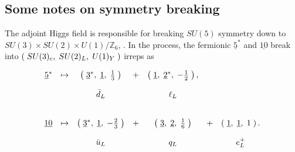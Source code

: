 \documentclass[letterpaper,12pt,titlepage,oneside,final]{book}
\begin{document}

\subsection{Some notes on symmetry breaking  }

The adjoint Higgs field  is responsible for breaking $SU(5)$ symmetry down to $SU(3)\times SU(2) \times U(1)/\mathbb{Z}_6$, \cite{Robinson}.  In the process, the fermionic $\underline{5}^*$ and $\underline{10}$ break into $\left(\hspace{1mm}SU(3)_c, \hspace{1mm}SU(2)_L, \hspace{1mm}U(1)_Y\hspace{1mm}\right)$ irreps as

\begin{equation}\begin{array}{rcccccc}
\underline{5}^* & \mapsto & \left(\hspace{1mm} \underline{3}^*, \hspace{1mm}\underline{1}, \hspace{1mm}\frac{1}{3} \hspace{1mm}\right) &+&\left(\hspace{1mm} \underline{1}, \hspace{1mm}\underline{2}^*, \hspace{1mm}-\frac{1}{2} \hspace{1mm}\right), & & \vspace{4mm}\\

& & \bar{d}_L &&\ell_L&  &   \vspace{8mm}\\

\underline{10} & \mapsto &  \left( \hspace{1mm}\underline{3}^*, \hspace{1mm}\underline{1}, \hspace{1mm}-\frac{2}{3} \hspace{1mm}\right)&+&\left( \hspace{1mm}\underline{3}, \hspace{1mm}\underline{2}, \hspace{1mm}\frac{1}{6}\hspace{1mm} \right)&+&\left( \hspace{1mm}\underline{1}, \hspace{1mm}\underline{1}, \hspace{1mm}1\hspace{1mm} \right). \vspace{4mm}\\

& & \bar{u}_L &&q_L&  &   e^+_L


\end{array}
\end{equation}
\end{document}
